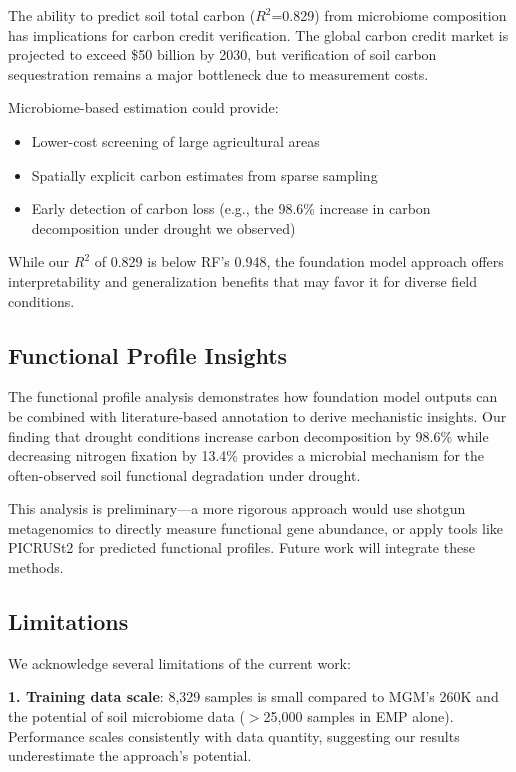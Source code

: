 \documentclass[11pt,a4paper]{article}
\begin{document}
The ability to predict soil total carbon ($R^2$=0.829) from microbiome composition has implications for carbon credit verification. The global carbon credit market is projected to exceed \$50 billion by 2030, but verification of soil carbon sequestration remains a major bottleneck due to measurement costs.

Microbiome-based estimation could provide:
\begin{itemize}[leftmargin=1.5em]
    \item Lower-cost screening of large agricultural areas
    \item Spatially explicit carbon estimates from sparse sampling
    \item Early detection of carbon loss (e.g., the 98.6\% increase in carbon decomposition under drought we observed)
\end{itemize}

While our $R^2$ of 0.829 is below RF's 0.948, the foundation model approach offers interpretability and generalization benefits that may favor it for diverse field conditions.

\subsection{Functional Profile Insights}

The functional profile analysis demonstrates how foundation model outputs can be combined with literature-based annotation to derive mechanistic insights. Our finding that drought conditions increase carbon decomposition by 98.6\% while decreasing nitrogen fixation by 13.4\% provides a microbial mechanism for the often-observed soil functional degradation under drought.

This analysis is preliminary---a more rigorous approach would use shotgun metagenomics to directly measure functional gene abundance, or apply tools like PICRUSt2 for predicted functional profiles. Future work will integrate these methods.

\subsection{Limitations}

We acknowledge several limitations of the current work:

\textbf{1. Training data scale}: 8,329 samples is small compared to MGM's 260K and the potential of soil microbiome data ($>$25,000 samples in EMP alone). Performance scales consistently with data quantity, suggesting our results underestimate the approach's potential.
\end{document}
